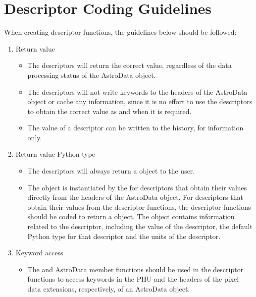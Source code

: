 \documentclass[letterpaper,10pt,english]{sphinxmanual}
\begin{document}
\section{Descriptor Coding Guidelines}
\label{coding:descriptor-coding-guidelines}
When creating descriptor functions, the guidelines below should be followed:
\begin{enumerate}
\item {} 
Return value
\begin{itemize}
\item {} 
The descriptors will return the correct value, regardless of the data
processing status of the AstroData object.

\item {} 
The descriptors will not write keywords to the headers of the AstroData
object or cache any information, since it is no effort to use the
descriptors to obtain the correct value as and when it is required.

\item {} 
The value of a descriptor can be written to the history, for information
only.

\end{itemize}

\item {} 
Return value Python type
\begin{itemize}
\item {} 
The descriptors will always return a  object to the user.

\item {} 
The  object is instantiated by the  for descriptors that
obtain their values directly from the headers of the AstroData object.
For descriptors that obtain their values from the descriptor functions,
the descriptor functions should be coded to return a  object. The
 object contains information related to the descriptor, including
the value of the descriptor, the default Python type for that descriptor
and the units of the descriptor.

\end{itemize}

\item {} 
Keyword access
\begin{itemize}
\item {} 
The  and  AstroData member
functions should be used in the descriptor functions to access keywords
in the PHU and the headers of the pixel data extensions, respectively,
of an AstroData object.


\end{itemize}
\end{enumerate}
\end{document}
